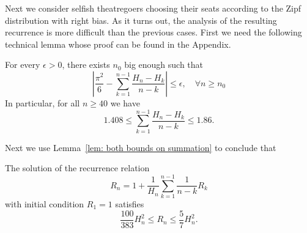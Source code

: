 \documentclass[11pt]{llncs}
\begin{document}
Next we consider  selfish theatregoers choosing their seats according to 
the Zipf distribution 
with right bias. As it turns out, the analysis of the resulting recurrence is
more difficult than the previous cases. First we need the following technical lemma whose proof can be found in the Appendix.
\begin{lemma}\label{lem: both bounds on summation}
For every $\epsilon>0$, there exists $n_0$ big enough such that
$$
\left| \frac{\pi^2}6 - \sum_{k=1}^{n-1}\frac{H_n-H_k}{n-k} \right| \leq \epsilon, \quad \forall n\geq n_0
$$
In particular, for all $n \geq 40$ we have 
$$
1.408 \leq \sum_{k=1}^{n-1}\frac{H_n-H_k}{n-k} \leq 1.86.
$$
\end{lemma}
Next we use Lemma~\ref{lem: both bounds on summation} to conclude that
\begin{lemma}
\label{costis2}
The solution of the recurrence relation 
$$R_n = 1 + \frac1{H_n}\sum_{k=1}^{n-1}\frac{1}{n-k}R_k$$
with initial condition $R_1=1$ satisfies \begin{equation}\label{equa: both bounds}
\frac{100}{383} H^2_n \leq R_n \leq  \frac{5}{7} H^2_n.
\end{equation}
\end{lemma}
\end{document}
